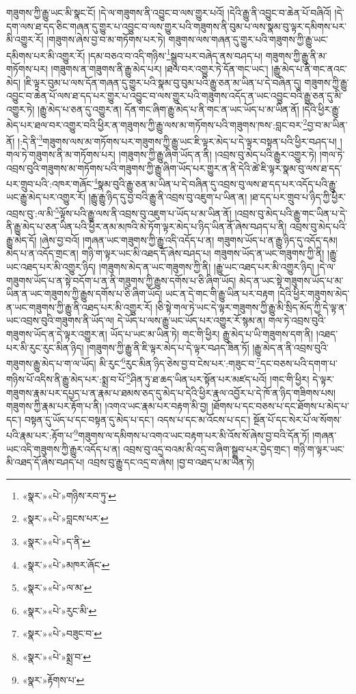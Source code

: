 གཟུགས་ཀྱི་རྒྱུ་ཡང་མི་སྣང་ངོ། །དེ་ལ་གཟུགས་ནི་འབྱུང་བ་ལས་གྱུར་པའོ། །དེའི་རྒྱུ་ནི་འབྱུང་བ་ཆེན་པོ་བཞིའོ། །དེ་དག་ལས་ཐ་དད་ཅིང་གཞན་དུ་གྱུར་པ་འབྱུང་བ་ལས་གྱུར་པའི་གཟུགས་ནི་བུམ་པ་ལས་སྣམ་བུ་ལྟར་དམིགས་པར་མི་འགྱུར་རོ། །གཟུགས་ཞེས་བྱ་བ་མ་གཏོགས་པར་ཏེ། གཟུགས་ལས་གཞན་དུ་གྱུར་པའི་གཟུགས་ཀྱི་རྒྱུ་ཡང་དམིགས་པར་མི་འགྱུར་རོ། །དམ་བཅའ་བ་འདི་གཉིས་\footnote{«སྣར་»«པེ་»གཉིས་རབ་ཏུ་}སྒྲུབ་པར་བཞེད་ནས་བཤད་པ། གཟུགས་ཀྱི་རྒྱུ་ནི་མ་གཏོགས་པར། །གཟུགས་ན་གཟུགས་ནི་རྒྱུ་མེད་པར། །ཐལ་བར་འགྱུར་ཏེ་དོན་གང་ཡང་། །རྒྱུ་མེད་པ་ནི་གང་ནའང་མེད། །ཇི་ལྟར་བུམ་པ་ལས་དོན་གཞན་དུ་གྱུར་པའི་སྣམ་བུ་བུམ་པའི་རྒྱུ་ཅན་མ་ཡིན་པ་དེ་བཞིན་དུ། གཟུགས་ཀྱི་རྒྱུ་འབྱུང་བ་ཆེན་པོ་ལས་ཐ་དད་པར་གྱུར་པ་འབྱུང་བ་ལས་གྱུར་པའི་གཟུགས་འདོད་ན་ཡང་འབྱུང་བའི་རྒྱུ་ཅན་དུ་མི་འགྱུར་ཏེ། །རྒྱུ་མེད་པ་ཅན་དུ་འགྱུར་ན། དོན་གང་ཞིག་རྒྱུ་མེད་པ་ནི་གང་ན་ཡང་ཡོད་པ་མ་ཡིན་ནོ། །དེའི་ཕྱིར་རྒྱུ་མེད་པར་ཐལ་བར་འགྱུར་བའི་ཕྱིར་ན་གཟུགས་ཀྱི་རྒྱུ་ལས་མ་གཏོགས་པའི་གཟུགས་ཁས་:བླང་བར་\footnote{«སྣར་»«པེ་»བླངས་པར་}བྱ་བ་མ་ཡིན་ནོ། །:དེ་ནི་\footnote{«སྣར་»«པེ་»ད་ནི་}གཟུགས་ལས་མ་གཏོགས་པར་གཟུགས་ཀྱི་རྒྱུ་ཡང་ཇི་ལྟར་མེད་པ་དེ་ལྟར་བསྟན་པའི་ཕྱིར་བཤད་པ། །གལ་ཏེ་གཟུགས་ནི་མ་གཏོགས་པར། །གཟུགས་ཀྱི་རྒྱུ་ཞིག་ཡོད་ན་ནི། །འབྲས་བུ་མེད་པའི་རྒྱུར་འགྱུར་ཏེ། །གལ་ཏེ་འབྲས་བུའི་གཟུགས་མ་གཏོགས་པའི་གཟུགས་ཀྱི་རྒྱུ་ཞིག་ཡོད་པར་གྱུར་ན་ནི་དེའི་ཚེ་ཇི་ལྟར་སྣམ་བུ་ལས་ཐ་དད་པར་གྲུབ་པའི་:འཁར་གཞོང་\footnote{«སྣར་»«པེ་»མཁར་ཞོང་}སྣམ་བུའི་རྒྱུ་ཅན་མ་ཡིན་པ་དེ་བཞིན་དུ་འབྲས་བུ་ལས་ཐ་དད་པར་འདོད་པའི་རྒྱུ་ཡང་རྒྱུ་མེད་པར་འགྱུར་རོ། །རྒྱུ་རྒྱུ་ཉིད་དུ་བྱ་བའི་རྒྱུ་ནི་འབྲས་བུ་འཇུག་པ་ཡིན་ན། །ཐ་དད་པར་གྲུབ་པ་ཉིད་ཀྱི་ཕྱིར་འབྲས་བུ་:ལ་མི་\footnote{«སྣར་»«པེ་»ལ་མ་}ལྟོས་པའི་རྒྱུ་ལས་ནི་འབྲས་བུ་འཇུག་པ་ཡོད་པ་མ་ཡིན་ནོ། །འབྲས་བུ་མེད་པའི་རྒྱུ་གང་ཡིན་པ་དེ་ནི་རྒྱུ་མེད་པ་ཅན་ཡིན་པའི་ཕྱིར་ནམ་མཁའི་མེ་ཏོག་ལྟར་མེད་པ་ཉིད་ཡིན་ནོ་ཞེས་བཤད་པ་ནི། འབྲས་བུ་མེད་པའི་རྒྱུ་མེད་དོ། །ཞེས་བྱ་བའོ། །གཞན་ཡང་གཟུགས་ཀྱི་རྒྱུ་འདི་འདོད་པ་ན། གཟུགས་ཡོད་པ་ན་རྒྱུ་ཉིད་དུ་འདོད་དམ། མེད་པ་ན་འདོད་གྲང་ན། གཉི་ག་ལྟར་ཡང་མི་འཐད་དོ་ཞེས་བཤད་པ། གཟུགས་ཡོད་ན་ཡང་གཟུགས་ཀྱི་ནི། །རྒྱུ་ཡང་འཐད་པར་མི་འགྱུར་ཉིད། །གཟུགས་མེད་ན་ཡང་གཟུགས་ཀྱི་ནི། །རྒྱུ་ཡང་འཐད་པར་མི་འགྱུར་ཉིད། །དེ་ལ་གཟུགས་ཡོད་པ་ན་སྟེ་བདོག་པ་ན་ནི་གཟུགས་ཀྱི་རྒྱུས་དགོས་པ་ཅི་ཞིག་ཡོད། མེད་ན་ཡང་སྟེ་གཟུགས་ཡོད་པ་མ་ཡིན་ན་ཡང་གཟུགས་ཀྱི་རྒྱུས་དགོས་པ་ཅི་ཞིག་ཡོད། ཡང་ན་དེ་གང་གི་རྒྱུ་ཡིན་པར་བརྟག །དེའི་ཕྱིར་གཟུགས་མེད་ན་ཡང་གཟུགས་ཀྱི་རྒྱུ་ནི་འཐད་པར་མི་འགྱུར་རོ། །ཅི་སྟེ་གལ་ཏེ་ཡང་དེ་ལྟར་གཟུགས་ཀྱི་རྒྱུ་མི་སྲིད་མོད་ཀྱི་དེ་ལྟ་ན་ཡང་འབྲས་བུའི་གཟུགས་ནི་ཡོད་ལ། དེ་ཡོད་པ་ལས་རྒྱུ་ཡང་ཡོད་པར་འགྱུར་རོ་སྙམ་ན། གལ་ཏེ་འབྲས་བུའི་གཟུགས་ཡོད་ན་དེ་ལྟར་འགྱུར་ན། ཡོད་པ་ཡང་མ་ཡིན་ཏེ། གང་གི་ཕྱིར། རྒྱུ་མེད་པ་ཡི་གཟུགས་དག་ནི། །འཐད་པར་མི་རུང་རུང་མིན་ཉིད། །གཟུགས་ཀྱི་རྒྱུ་ནི་ཇི་ལྟར་མེད་པ་དེ་ལྟར་བཤད་ཟིན་ཏོ། །རྒྱུ་མེད་ན་ནི་འབྲས་བུའི་གཟུགས་རྒྱུ་མེད་པ་ག་ལ་ཡོད། མི་རུང་\footnote{«སྣར་»«པེ་»རུང་མི་}རུང་མིན་ཉིད་ཅེས་བྱ་བ་ངེས་པར་:གཟུང་བ་\footnote{«སྣར་»«པེ་»བཟུང་བ་}དང་བཅས་པའི་དགག་པ་གཉིས་པོ་འདིས་ནི་རྒྱུ་མེད་པར་:སྨྲ་བ་པོ་\footnote{«སྣར་»«པེ་»སྨྲ་བ་}ཤིན་ཏུ་ཐ་ཆད་ཡིན་པར་སྟོན་པར་མཛད་པའོ། །གང་གི་ཕྱིར། དེ་ལྟར་གཟུགས་རྣམ་པར་དཔྱད་པ་ན་རྣམ་པ་ཐམས་ཅད་དུ་མེད་པ་དེའི་ཕྱིར་རྣལ་འབྱོར་པ་དེ་ཁོ་ན་ཉིད་གཟིགས་པས། གཟུགས་ཀྱི་རྣམ་པར་རྟོག་པ་ནི། །འགའ་ཡང་རྣམ་པར་བརྟག་མི་བྱ། །ཐོགས་པ་དང་བཅས་པ་དང་ཐོགས་པ་མེད་པ་དང་། བསྟན་དུ་ཡོད་པ་དང་བསྟན་དུ་མེད་པ་དང་། འདས་པ་དང་མ་འོངས་པ་དང་། སྔོན་པོ་དང་སེར་པོ་ལ་སོགས་པའི་རྣམ་པར་:རྟོག་པ་\footnote{«སྣར་»རྟོགས་པ་}གཟུགས་ལ་དམིགས་པ་འགའ་ཡང་བརྟག་པར་མི་འོས་སོ་ཞེས་བྱ་བའི་དོན་ཏོ། །གཞན་ཡང་འདི་གཟུགས་ཀྱི་རྒྱུར་འདོད་པ་ན། འབྲས་བུ་འདྲ་བའམ་མི་འདྲ་བ་ཞིག་སྒྲུབ་པར་བྱེད་གྲང་། གཉི་ག་ལྟར་ཡང་མི་འཐད་དོ་ཞེས་བཤད་པ། འབྲས་བུ་རྒྱུ་དང་འདྲ་བ་ཞེས། །བྱ་བ་འཐད་པ་མ་ཡིན་ཏེ། 